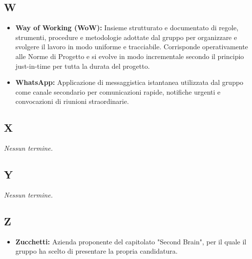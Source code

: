 {}
\subsection*{W}
\begin{itemize}[leftmargin=*]
    \item \textbf{Way of Working (WoW):} Insieme strutturato e documentato di
          regole, strumenti, procedure e metodologie adottate dal gruppo per
          organizzare e svolgere il lavoro in modo uniforme e tracciabile.
          Corrisponde operativamente alle Norme di Progetto e si evolve in modo
          incrementale secondo il principio just-in-time per tutta la durata del
          progetto.
    \item \textbf{WhatsApp:} Applicazione di messaggistica istantanea utilizzata
          dal gruppo come canale secondario per comunicazioni rapide, notifiche
          urgenti e convocazioni di riunioni straordinarie.
\end{itemize}
 
{}
\subsection*{X}
\textit{Nessun termine.}
 
{}
\subsection*{Y}
\textit{Nessun termine.}
 
{}
\subsection*{Z}
\begin{itemize}[leftmargin=*]
    \item \textbf{Zucchetti:} Azienda proponente del capitolato "Second Brain", per il quale il gruppo ha scelto di presentare la propria candidatura.
\end{itemize}